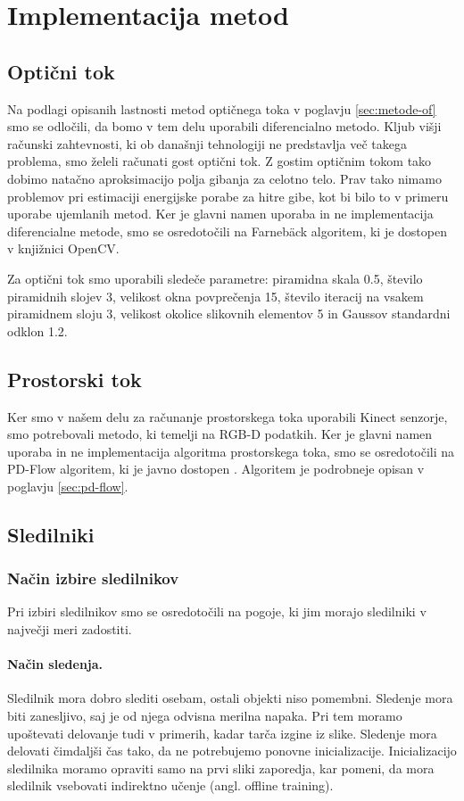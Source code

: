\section{Implementacija metod}
\subsection{Optični tok}
Na podlagi opisanih lastnosti metod optičnega toka v poglavju \ref{sec:metode-of} smo se odločili, da bomo v tem delu uporabili diferencialno metodo. Kljub višji računski zahtevnosti, ki ob današnji tehnologiji ne predstavlja več takega problema, smo želeli računati gost optični tok. Z gostim optičnim tokom tako dobimo natačno aproksimacijo polja gibanja za celotno telo. Prav tako nimamo problemov pri estimaciji energijske porabe za hitre gibe, kot bi bilo to v primeru uporabe ujemlanih metod. Ker je glavni namen uporaba in ne implementacija diferencialne metode, smo se osredotočili na Farneb{\"a}ck algoritem, ki je dostopen v knjižnici OpenCV.

Za optični tok smo uporabili sledeče parametre: piramidna skala \num{0.5}, število piramidnih slojev \num{3}, velikost okna povprečenja \num{15}, število iteracij na vsakem piramidnem sloju \num{3}, velikost okolice slikovnih elementov \num{5} in Gaussov standardni odklon \num{1.2}.

\subsection{Prostorski tok}
Ker smo v našem delu za računanje prostorskega toka uporabili Kinect senzorje, smo potrebovali metodo, ki temelji na RGB-D podatkih. Ker je glavni namen uporaba in ne implementacija algoritma prostorskega toka, smo se osredotočili na PD-Flow algoritem, ki je javno dostopen \cite{jaimez2015primal}. Algoritem je podrobneje opisan v poglavju \ref{sec:pd-flow}.



\subsection{Sledilniki}
\subsubsection{Način izbire sledilnikov}\label{sec:pogoji-sledilnikov}
Pri izbiri sledilnikov smo se osredotočili na pogoje, ki jim morajo sledilniki v največji meri zadostiti.

\paragraph{Način sledenja.} Sledilnik mora dobro slediti osebam, ostali objekti niso pomembni. Sledenje mora biti zanesljivo, saj je od njega odvisna merilna napaka. Pri tem moramo upoštevati delovanje tudi v primerih, kadar tarča izgine iz slike. Sledenje mora delovati čimdaljši čas tako, da ne potrebujemo ponovne inicializacije. Inicializacijo sledilnika moramo opraviti samo na prvi sliki zaporedja, kar pomeni, da mora sledilnik vsebovati indirektno učenje (angl. offline training).

